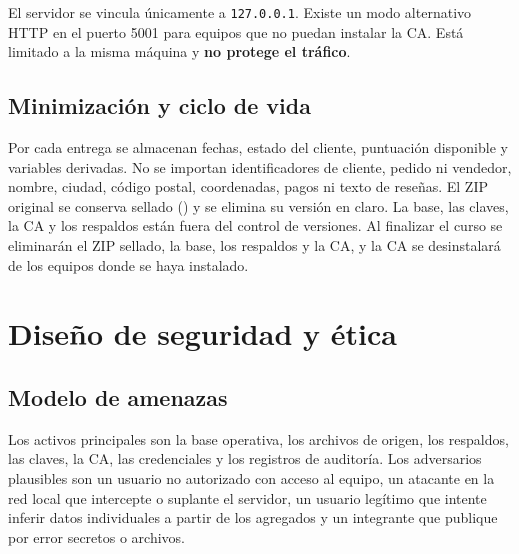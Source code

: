 \documentclass[12pt,a4paper]{article}
\begin{document}
El servidor se vincula únicamente a \texttt{127.0.0.1}. Existe un modo alternativo HTTP en el puerto 5001 para equipos que no puedan instalar la CA. Está limitado a la misma máquina y \textbf{no protege el tráfico}.

\subsection{Minimización y ciclo de vida}
Por cada entrega se almacenan fechas, estado del cliente, puntuación disponible y variables derivadas. No se importan identificadores de cliente, pedido ni vendedor, nombre, ciudad, código postal, coordenadas, pagos ni texto de reseñas. El ZIP original se conserva sellado () y se elimina su versión en claro. La base, las claves, la CA y los respaldos están fuera del control de versiones. Al finalizar el curso se eliminarán el ZIP sellado, la base, los respaldos y la CA, y la CA se desinstalará de los equipos donde se haya instalado.

\section{Diseño de seguridad y ética}
\subsection{Modelo de amenazas}
\label{sec:amenazas}
Los activos principales son la base operativa, los archivos de origen, los respaldos, las claves, la CA, las credenciales y los registros de auditoría. Los adversarios plausibles son un usuario no autorizado con acceso al equipo, un atacante en la red local que intercepte o suplante el servidor, un usuario legítimo que intente inferir datos individuales a partir de los agregados y un integrante que publique por error secretos o archivos.
\end{document}
